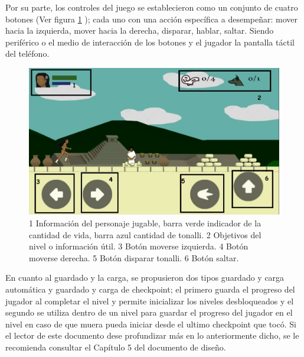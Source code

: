 \par
Por su parte, los controles del juego se establecieron como un conjunto de cuatro 
botones (Ver figura \ref{fig:GUI} ); cada uno con una acción específica a 
desempeñar: mover hacia la izquierda, mover hacia la derecha, disparar, hablar, 
saltar. Siendo periférico o el medio de interacción de los botones y el jugador 
la pantalla táctil del teléfono.  

\begin{figure}
				\centering
				\includegraphics[height=0.3 \textheight]{05TrabajoRealizado/01DocDiseno02/imagenes/ControlCorrerDer}
				\caption{1 Información del personaje jugable, barra verde indicador 
				de la cantidad de vida, barra azul cantidad de tonalli. 2 Objetivos 
				del nivel o información útil. 3 Botón moverse izquierda. 4 Botón 
				moverse derecha. 5 Botón disparar tonalli. 6 Botón saltar.}
				\label{fig:GUI}
\end{figure}


\par
En cuanto al guardado y la carga, se propusieron dos tipos guardado y carga automática 
y guardado y carga de checkpoint; el primero guarda el progreso del jugador al 
completar el nivel y permite inicializar los niveles desbloqueados y el segundo 
se utiliza dentro de un nivel para guardar el progreso del jugador en el nivel 
en caso de que muera pueda iniciar desde el ultimo checkpoint que tocó. 
Si el lector de este documento dese profundizar más en lo anteriormente dicho, 
se le recomienda consultar el Capítulo 5 del documento de diseño.